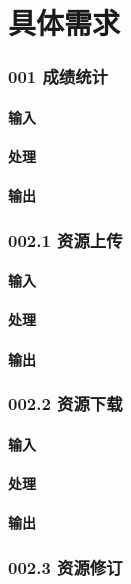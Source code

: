 \chapter{具体需求}
  \subsection{001 成绩统计}
    \subsubsection{输入}
    \subsubsection{处理}
    \subsubsection{输出}

  \subsection{002.1 资源上传}
    \subsubsection{输入}
    \subsubsection{处理}
    \subsubsection{输出}

  \subsection{002.2 资源下载}
    \subsubsection{输入}
    \subsubsection{处理}
    \subsubsection{输出}

  \subsection{002.3 资源修订}
